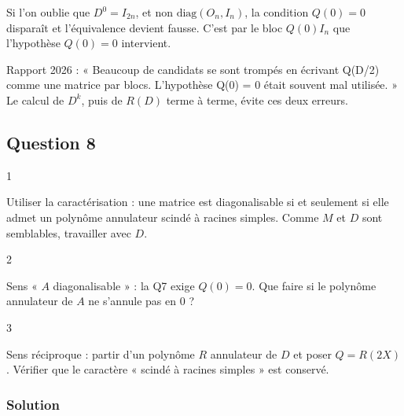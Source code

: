 \documentclass[11pt,a4paper]{article}
\begin{document}
\begin{piege}

Si l'on oublie que \(D^0=I_{2n}\), et non \(\mathrm{diag}(O_n,I_n)\), la condition \(Q(0)=0\) disparaît et l'équivalence devient fausse. C'est par le bloc \(Q(0)I_n\) que l'hypothèse \(Q(0)=0\) intervient.

\end{piege}

\begin{jury}

Rapport 2026 : « Beaucoup de candidats se sont trompés en écrivant Q(D/2) comme une matrice par blocs. L'hypothèse Q(0) = 0 était souvent mal utilisée. » Le calcul de \(D^k\), puis de \(R(D)\) terme à terme, évite ces deux erreurs.

\end{jury}

\hypertarget{question-8}{%
\subsection{Question 8}\label{question-8}}

\begin{indication}{1}

Utiliser la caractérisation : une matrice est diagonalisable si et seulement si elle admet un polynôme annulateur scindé à racines simples. Comme \(M\) et \(D\) sont semblables, travailler avec \(D\).

\end{indication}

\begin{indication}{2}

Sens « \(A\) diagonalisable » : la Q7 exige \(Q(0)=0\). Que faire si le polynôme annulateur de \(A\) ne s'annule pas en \(0\) ?

\end{indication}

\begin{indication}{3}

Sens réciproque : partir d'un polynôme \(R\) annulateur de \(D\) et poser \(Q=R(2X)\). Vérifier que le caractère « scindé à racines simples » est conservé.

\end{indication}

\hypertarget{solution-7}{%
\subsubsection{Solution}\label{solution-7}}
\end{document}
